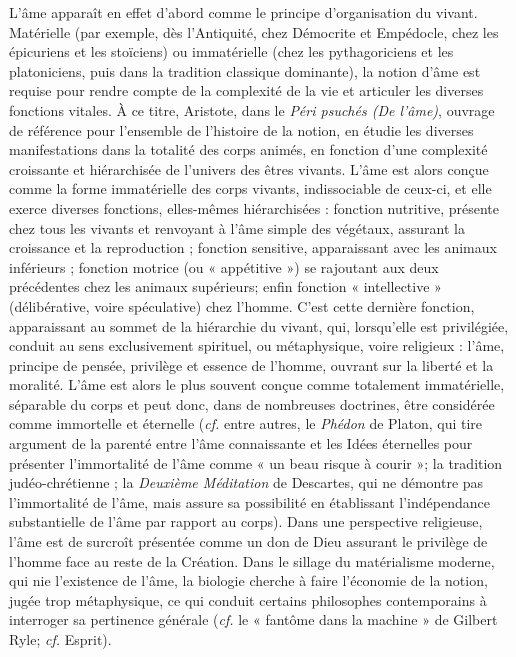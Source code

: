 L'âme apparaît en effet d'abord comme le principe d'organisation du vivant. Matérielle (par exemple, dès l'Antiquité, chez Démocrite et Empédocle, chez les épicuriens et les stoïciens) ou immatérielle (chez les pythagoriciens et les platoniciens, puis dans la tradition classique dominante), la notion d'âme est requise pour rendre compte de la complexité de la vie et articuler les diverses fonctions vitales. À ce titre, Aristote, dans le {\it Péri psuchés (De  l'âme)}, ouvrage de référence pour l'ensemble de l'histoire de la notion, en étudie les diverses manifestations dans la totalité des corps animés, en fonction d'une complexité croissante et hiérarchisée de l'univers des êtres vivants. L'âme est alors conçue comme la forme immatérielle des corps vivants, indissociable de ceux-ci, et elle exerce diverses fonctions, elles-mêmes hiérarchisées : fonction nutritive, présente chez tous les vivants et renvoyant à l'âme simple des végétaux, assurant la croissance et la reproduction ; fonction sensitive, apparaissant avec les animaux inférieurs ; fonction motrice (ou « appétitive ») se rajoutant aux deux précédentes chez les animaux supérieurs; enfin fonction « intellective » (délibérative, voire spéculative) chez l'homme. C'est cette dernière fonction, apparaissant au sommet de la hiérarchie du vivant, qui, lorsqu'elle est privilégiée, conduit au sens exclusivement spirituel, ou métaphysique, voire religieux : l'âme, principe de pensée, privilège et essence de l'homme, ouvrant sur la liberté et la moralité. L'âme est alors le plus souvent conçue comme totalement immatérielle, séparable du corps et peut donc, dans de nombreuses doctrines, être considérée comme immortelle et éternelle ({\it cf.} entre autres, le {\it Phédon} de Platon, qui tire argument de la parenté entre l'âme connaissante et les Idées éternelles
pour présenter l'immortalité de l'âme comme « un beau risque à courir »;
la tradition judéo-chrétienne ; 
la {\it Deuxième Méditation} de Descartes, qui ne démontre pas l'immortalité de l'âme, mais assure sa possibilité en établissant l'indépendance substantielle de l'âme par rapport au corps). Dans une perspective religieuse, l'âme est de surcroît présentée comme un don de Dieu assurant le privilège de l'homme face au reste de la Création. Dans le sillage du matérialisme moderne, qui nie l'existence de l'âme, la biologie cherche à faire l'économie de la notion, jugée trop métaphysique, ce qui conduit certains philosophes contemporains à interroger sa pertinence générale ({\it cf.} le « fantôme dans la machine » de Gilbert Ryle; {\it cf.} Esprit).

